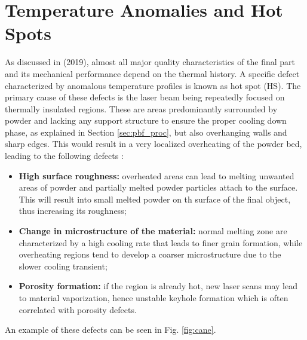 
\section{Temperature Anomalies and Hot Spots}
\label{sec:hotspot}
As discussed in \citeauthor{williams_situ_2019} (2019), almost all major quality characteristics of the final part and its mechanical performance depend on the thermal history. A specific defect characterized by anomalous temperature profiles is known as hot spot (HS). The primary cause of these defects is the laser beam being repeatedly focused on thermally insulated regions. These are areas predominantly surrounded by powder and lacking any support structure to ensure the proper cooling down phase, as explained in Section \ref{sec:pbf_proc}, but also overhanging walls and sharp edges. This would result in a very localized overheating of the powder bed, leading to the following defects \cite{bugatti_towards_2022}:
\begin{itemize}
    \item \textbf{High surface roughness:} overheated areas can lead to melting unwanted areas of powder and partially melted powder particles attach to the surface. This will result into small melted powder on th surface of the final object, thus increasing its roughness;
    \item \textbf{Change in microstructure of the material:} normal melting zone are characterized by a high cooling rate that leads to finer grain formation, while overheating regions tend to develop a coarser microstructure due to the slower cooling transient;
    \item \textbf{Porosity formation:} if the region is already hot, new laser scans may lead to material vaporization, hence unstable keyhole formation which is often correlated with porosity defects.
\end{itemize} An example of these defects can be seen in Fig. \ref{fig:cane}.

